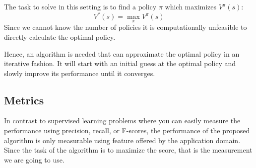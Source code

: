 \documentclass[a4paper,10pt]{article}
\begin{document}
The task to solve in this setting is to find a policy $\pi$ which maximizes $V^\pi(s)$:
\[V^*(s) = \max_\pi V^\pi(s)\]
Since we cannot know the number of policies it is computationally unfeasible to directly calculate the optimal policy.

Hence, an algorithm is needed that can approximate the optimal policy in an iterative fashion.
It will start with an initial guess at the optimal policy and slowly improve its performance until it converges.





\subsection{Metrics}

In contrast to supervised learning problems where you can easily measure the performance using precision, recall, or F-scores, the performance of the proposed algorithm is only measurable using feature offered by the application domain.
Since the task of the algorithm is to maximize the score, that is the measurement we are going to use.
\end{document}
